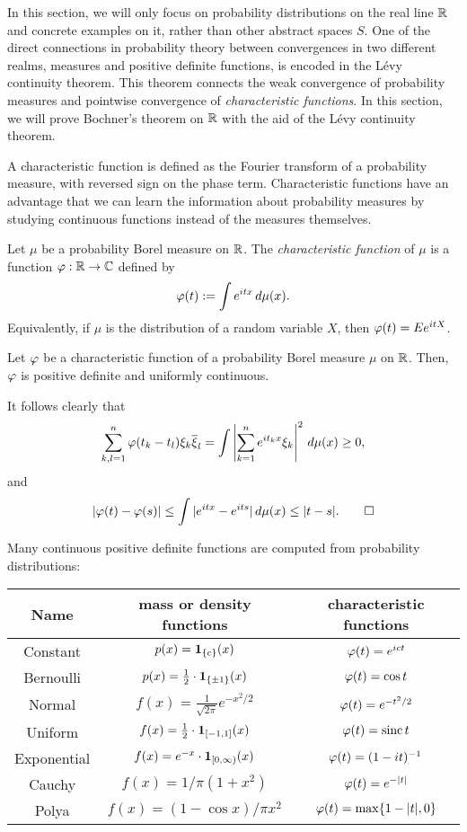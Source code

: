 \documentclass{../../small}
\begin{document}
In this section, we will only focus on probability distributions on the real line $\mathbb{R}$ and concrete examples on it, rather than other abstract spaces $S$.
One of the direct connections in probability theory between convergences in two different realms, measures and positive definite functions, is encoded in the L\'evy continuity theorem.
This theorem connects the weak convergence of probability measures and pointwise convergence of \emph{characteristic functions}.
In this section, we will prove Bochner's theorem on $\mathbb{R}$ with the aid of the L\'evy continuity theorem.

A characteristic function is defined as the Fourier transform of a probability measure, with reversed sign on the phase term.
Characteristic functions have an advantage that we can learn the information about probability measures by studying continuous functions instead of the measures themselves.

\begin{defn}
Let $\mu$ be a probability Borel measure on $\mathbb{R}$.
The \emph{characteristic function} of $\mu$ is a function $\varphi:\mathbb{R}\to\mathbb{C}$ defined by
\[\varphi(t):=\int e^{itx}\,d\mu(x).\]
Equivalently, if $\mu$ is the distribution of a random variable $X$, then $\varphi(t)=Ee^{itX}$.
\end{defn}

\begin{prop}
Let $\varphi$ be a characteristic function of a probability Borel measure $\mu$ on $\mathbb{R}$.
Then, $\varphi$ is positive definite and uniformly continuous.
\end{prop}
\begin{pf}
It follows clearly that
\[\sum_{k,l=1}^n\varphi(t_k-t_l)\xi_k\overline\xi_l=\int\left|\sum_{k=1}^ne^{it_kx}\xi_k\right|^2\,d\mu(x)\ge0,\]
and
\[|\varphi(t)-\varphi(s)|\le\int|e^{itx}-e^{its}|\,d\mu(x)\le|t-s|.\qedhere\]
\end{pf}
\begin{ex}
Many continuous positive definite functions are computed from probability distributions:
\begin{center}\renewcommand{\arraystretch}{1.8}
\begin{tabular}{ccc}
Name & mass or density functions & characteristic functions\\\hline
Constant & $p(x)=\mathbf{1}_{\{c\}}(x)$ & $\varphi(t)=e^{ict}$\\
Bernoulli & $p(x)=\frac12\cdot\mathbf{1}_{\{\pm1\}}(x)$ & $\varphi(t)=\cos t$\\
Normal & $f(x)=\frac1{\sqrt{2\pi}}e^{-x^2/2}$ & $\varphi(t)=e^{-t^2/2}$\\
Uniform & $f(x)=\frac12\cdot\mathbf{1}_{[-1,1]}(x)$ & $\varphi(t)=\operatorname{sinc}t$\\
Exponential & $f(x)=e^{-x}\cdot\mathbf{1}_{[0,\infty)}(x)$ & $\varphi(t)=(1-it)^{-1}$\\
Cauchy & $f(x)=1/\pi(1+x^2)$ & $\varphi(t)=e^{-|t|}$\\
Polya & $f(x)=(1-\cos x)/\pi x^2$ & $\varphi(t)=\max\{1-|t|,0\}$
\end{tabular}
\end{center}
\end{ex}
\end{document}
